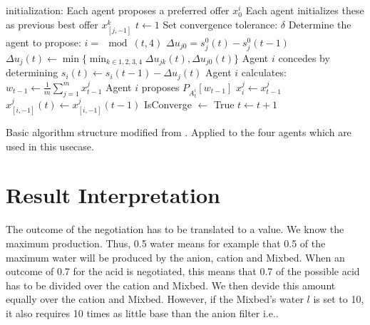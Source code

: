\begin{algorithm}[h]
	initialization: Each agent proposes a preferred offer $x^i_0$\;
	Each agent initializes these as previous best offer $x^k_{[j,-1]}$\;
	$t\leftarrow1$\;
	Set convergence tolerance: $\delta$\;
	{
		Determine the agent to propose: $i = \mod(t,4)$\;
		{
			{
				$\Delta u_{j0} = s^0_j(t)-s^0_j(t-1)$\;
				{
					$\Delta u_j(t)\leftarrow \min \{\displaystyle \min_{k\in 1, 2, 3, 4}\Delta u_{jk}(t), \Delta u_{j0}(t)\}$ \;	
				}
				Agent $i$ concedes by determining $s_i(t)\leftarrow s_i(t-1)-\Delta u_j(t)$\;
				Agent $i$ calculates: $w_{t-1}\leftarrow \frac{1}{m}\sum_{j=1}^{m}x^j_{t-1}$\;
				Agent $i$ proposes $P_{A^i_t}[w_{t-1}]$\;
			}{
				$x^j_i \leftarrow x^j_{t-1}$\;
				$x^j_{[i,-1]}(t) \leftarrow x^j_{[i,-1]}(t-1)$\;
			}
		}
		{
			IsConverge $\leftarrow $ True\;
		}{
			$t \leftarrow t+1$\;
		}
	}
\caption{Basic algorithm structure modified from \citep{zheng2015automated}. Applied to the four agents which are used in this usecase.}
\label{al:algorithm1}
\end{algorithm}
\clearpage
\section{Result Interpretation}
\label{sec:design:mean}
The outcome of the negotiation has to be translated to a value. We know the maximum production. Thus, 0.5 water means for example that 0.5 of the maximum water will be produced by the anion, cation and Mixbed. When an outcome of 0.7 for the acid is negotiated, this means that 0.7 of the possible acid has to be divided over the cation and Mixbed. We then devide this amount equally over the cation and Mixbed. However, if the Mixbed's water $l$ is set to 10, it also requires 10 times as little base than the anion filter i.e..

